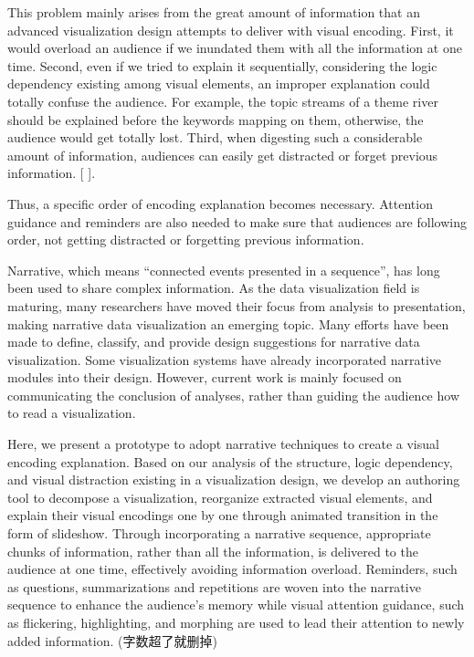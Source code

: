 \documentclass[review,journal]{vgtc}         %
\begin{document}
This problem mainly arises from the great amount of information that an advanced visualization design attempts to deliver with visual encoding. First, it would overload an audience if we inundated them with all the information at one time. Second, even if we tried to explain it sequentially, considering the logic dependency existing among visual elements, an improper explanation could totally confuse the audience. For example, the topic streams of a theme river should be explained before the keywords mapping on them, otherwise, the audience would get totally lost. Third, when digesting such a considerable amount of information, audiences can easily get distracted or forget previous information.  [ ]. \par
Thus, a specific order of encoding explanation becomes necessary. Attention guidance and reminders are also needed to make sure that audiences are following order, not getting distracted or forgetting previous information.\par
Narrative, which means “connected events presented in a sequence”, has long been used to share complex information. As the data visualization field is maturing, many researchers have moved their focus from analysis to presentation, making narrative data visualization an emerging topic\cite{kosara_storytelling:_2013}. Many efforts have been
made to define, classify, and provide design suggestions for narrative data visualization\cite{segel_narrative_2010,hullman_deeper_2013,gershon_what_2001}. Some visualization systems have already incorporated narrative modules into their design\cite{eccles_stories_2007,bryan_temporal_2016}. However, current work is mainly focused on communicating the conclusion of analyses, rather than guiding the audience how to read a visualization. \par
Here, we present a prototype to adopt narrative techniques to create a visual encoding explanation. Based on our analysis of the structure, logic dependency, and visual distraction existing in a visualization design, we develop an authoring tool to decompose a visualization, reorganize extracted visual elements, and explain their visual encodings one by one through animated transition in the form of slideshow. Through incorporating a narrative sequence, appropriate chunks of information, rather than all the information, is delivered to the audience at one time, effectively avoiding information overload. Reminders, such as questions, summarizations and repetitions are woven into the narrative sequence to enhance the audience’s memory while visual attention guidance, such as flickering, highlighting, and morphing are used to lead their attention to newly added information. (字数超了就删掉)\par
\end{document}
